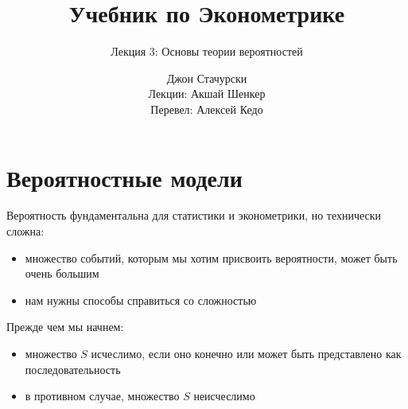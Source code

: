 






\title{Учебник по Эконометрике}

\subtitle
{Лекция 3: Основы теории вероятностей}

\author{Джон Стачурски \\ \vspace{.5em} 
	\scriptsize Лекции: Акшай Шенкер \\ \vspace{.1em} 
	\scriptsize Перевел: Алексей Кедо}




\begin{frame}
  \titlepage
\end{frame}

\section{Вероятностные модели}

\begin{frame}

    \vspace{2em}
    Вероятность фундаментальна для статистики и эконометрики, но технически сложна:
    
    \begin{itemize}
        \item множество событий, которым мы хотим присвоить вероятности, может быть очень большим 
        \item нам нужны способы справиться со сложностью 
    \end{itemize}
    
    \vspace{1em}
    Прежде чем мы начнем:
    \begin{itemize}
        \item множество $S$ исчеслимо, если оно конечно или может быть представлено 
        как последовательность 
        \item в противном случае, множество $S$ неисчеслимо
    \end{itemize}

\end{frame}

